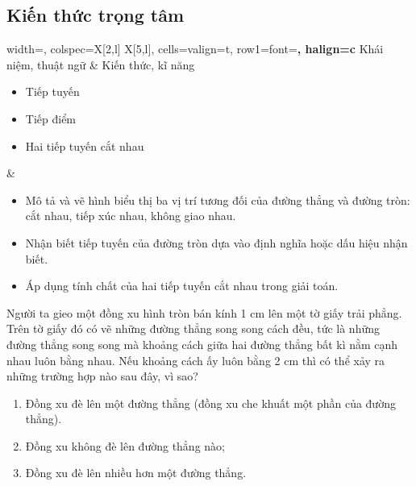 \begin{lesson}
    \subsection{Kiến thức trọng tâm}

    \begin{center}
    \begin{tblr}{
        width=\linewidth,
        colspec={X[2,l] X[5,l]},
        cells={valign=t},
        row{1}={font=\bfseries, halign=c}
    }
        Khái niệm, thuật ngữ & Kiến thức, kĩ năng \\
        \begin{minipage}[t]{\linewidth}
        \begin{itemize}
            \item Tiếp tuyến
            \item Tiếp điểm
            \item Hai tiếp tuyến cắt nhau
        \end{itemize}
        \end{minipage}
        &
        \begin{minipage}[t]{\linewidth}
        \begin{itemize}
            \item Mô tả và vẽ hình biểu thị ba vị trí tương đối của đường thẳng và đường tròn: cắt nhau, tiếp xúc nhau, không giao nhau.
            \item Nhận biết tiếp tuyến của đường tròn dựa vào định nghĩa hoặc dấu hiệu nhận biết.
            \item Áp dụng tính chất của hai tiếp tuyến cắt nhau trong giải toán.
        \end{itemize}
        \end{minipage}
    \end{tblr}
    \end{center}

    Người ta gieo một đồng xu hình tròn bán kính 1 cm lên một tờ giấy trải phẳng. Trên tờ giấy đó có vẽ những đường thẳng song song cách đều, tức là những đường thẳng song song mà khoảng cách giữa hai đường thẳng bất kì nằm cạnh nhau luôn bằng nhau. Nếu khoảng cách ấy luôn bằng 2 cm thì có thể xảy ra những trường hợp nào sau đây, vì sao?


    \begin{enumerate}[label=\alph*)]
        \item Đồng xu đè lên một đường thẳng (đồng xu che khuất một phần của đường thẳng).
        \item Đồng xu không đè lên đường thẳng nào;
        \item Đồng xu đè lên nhiều hơn một đường thẳng.
    \end{enumerate}


\end{lesson}
